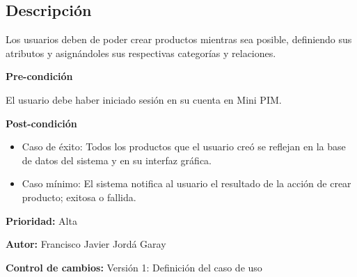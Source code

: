{}

\subsection*{Descripción}
Los usuarios deben de poder crear productos mientras sea posible, definiendo sus atributos y asignándoles sus respectivas categorías y relaciones.\par
\vspace{0.15cm}

\textbf{Pre-condición}\par
El usuario debe haber iniciado sesión en su cuenta en Mini PIM.\par
\vspace{0.15cm}

\textbf{Post-condición}
\begin{itemize}
    \item Caso de éxito: Todos los productos que el usuario creó se reflejan en la base de datos del sistema y en su interfaz gráfica.
    \item Caso mínimo: El sistema notifica al usuario el resultado de la acción de crear producto; exitosa o fallida.
\end{itemize}

\textbf{Prioridad: }
Alta
\vspace{0.15cm}

\textbf{Autor: }
Francisco Javier Jordá Garay\par
\vspace{0.15cm}

\textbf{Control de cambios: } Versión 1: Definición del caso de uso

